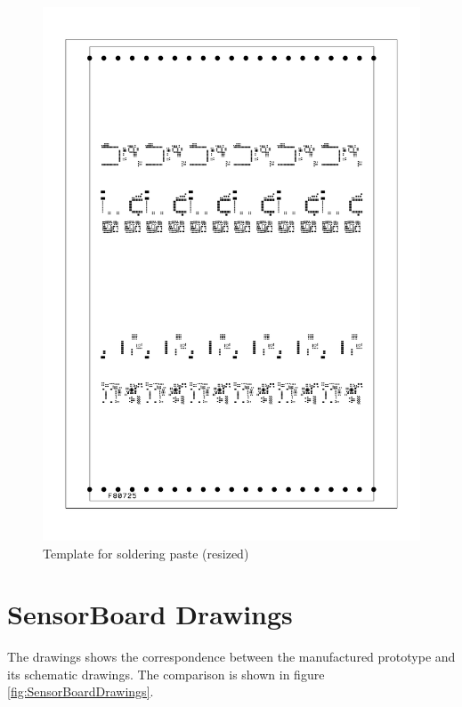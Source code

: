 \begin{figure}
	\centering
	\caption{Template for soldering paste (resized)}
	\label{smtPasteTemplate}
	\includegraphics[width=\linewidth]{img/smtPasteTemplate.pdf}
\end{figure}

\section{SensorBoard Drawings}
The  drawings shows the correspondence between the manufactured prototype and its schematic drawings. The comparison is shown in figure \ref{fig:SensorBoardDrawings}.

